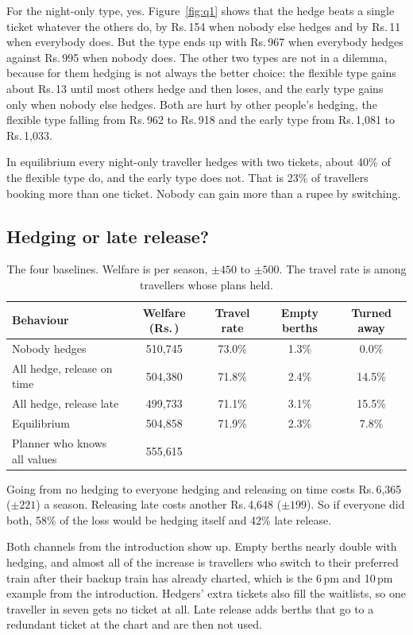 \documentclass{article}
\newcommand{\rs}{Rs.\,}
\theoremstyle{definition}
\begin{document}
For the night-only type, yes. Figure~\ref{fig:q1} shows that the hedge beats a single
ticket whatever the others do, by \rs154 when nobody else hedges and by \rs11 when
everybody does. But the type ends up with \rs967 when everybody hedges against \rs995 when
nobody does. The other two types are not in a dilemma, because for them hedging is not
always the better choice: the flexible type gains about \rs13 until most others hedge and
then loses, and the early type gains only when nobody else hedges. Both are hurt by other
people's hedging, the flexible type falling from \rs962 to \rs918 and the early type from
\rs1,081 to \rs1,033.

In equilibrium every night-only traveller hedges with two tickets, about 40\% of the
flexible type do, and the early type does not. That is 23\% of travellers booking more than one
ticket. Nobody can gain more than a rupee by switching.

\subsection{Hedging or late release?}

\begin{table}[ht]
\caption{The four baselines. Welfare is per season, $\pm450$ to $\pm500$. The travel rate
is among travellers whose plans held.}
\label{tab:q2}
\centering
\begin{tabular}{lcccc}
\toprule
Behaviour & Welfare (\rs) & Travel rate & Empty berths & Turned away \\
\midrule
Nobody hedges & 510,745 & 73.0\% & 1.3\% & 0.0\% \\
All hedge, release on time & 504,380 & 71.8\% & 2.4\% & 14.5\% \\
All hedge, release late & 499,733 & 71.1\% & 3.1\% & 15.5\% \\
Equilibrium & 504,858 & 71.9\% & 2.3\% & 7.8\% \\
Planner who knows all values & 555,615 & & & \\
\bottomrule
\end{tabular}
\end{table}

Going from no hedging to everyone hedging and releasing on time costs \rs6,365 ($\pm221$) a
season. Releasing late costs another \rs4,648 ($\pm199$). So if everyone did both, 58\% of
the loss would be hedging itself and 42\% late release.

Both channels from the introduction show up. Empty berths nearly double with hedging, and
almost all of the increase is travellers who switch to their preferred train after their
backup train has already charted, which is the 6\,pm and 10\,pm example from the introduction.
Hedgers' extra tickets also fill the waitlists, so one traveller in seven gets no ticket at
all. Late release adds berths that go to a redundant ticket at the chart and are then not
used.
\end{document}
